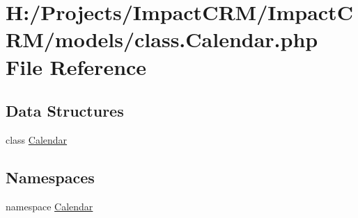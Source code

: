 \hypertarget{class_8Calendar_8php}{
\section{H:/Projects/ImpactCRM/ImpactCRM/models/class.Calendar.php File Reference}
\label{class_8Calendar_8php}
}
\subsection*{Data Structures}
\begin{DoxyCompactItemize}
\item 
class \hyperlink{classCalendar}{Calendar}
\end{DoxyCompactItemize}
\subsection*{Namespaces}
\begin{DoxyCompactItemize}
\item 
namespace \hyperlink{namespaceCalendar}{Calendar}
\end{DoxyCompactItemize}
